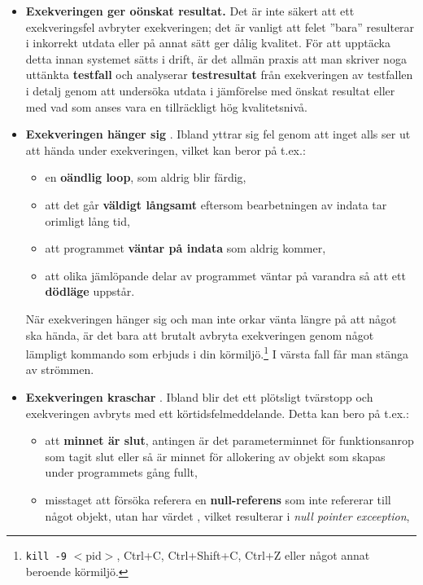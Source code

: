 \begin{itemize}
\begin{itemize}

\item \textbf{Exekveringen ger oönskat resultat.} Det är inte säkert att ett exekveringsfel avbryter exekveringen; det är vanligt att felet ''bara'' resulterar i inkorrekt utdata eller på annat sätt ger dålig kvalitet. För att upptäcka detta innan systemet sätts i drift, är det allmän praxis att man skriver noga uttänkta \textbf{testfall} och analyserar \textbf{testresultat} från exekveringen av  testfallen i detalj genom att undersöka utdata i jämförelse med önskat resultat eller med vad som anses vara en tillräckligt hög kvalitetsnivå.

\item \textbf{Exekveringen hänger sig} . Ibland yttrar sig fel genom att inget alls ser ut att hända under exekveringen, vilket kan beror på t.ex.:  
\begin{itemize}[nolistsep]
\item en \textbf{oändlig loop}, som aldrig blir färdig, 
\item att det går \textbf{väldigt långsamt} eftersom bearbetningen av indata tar orimligt lång tid,
\item att programmet \textbf{väntar på indata} som aldrig kommer,
\item att olika jämlöpande delar av programmet väntar på varandra så att ett \textbf{dödläge}  uppstår. 
\end{itemize}

När exekveringen hänger sig och man inte orkar vänta längre på att något ska hända, är det bara att brutalt avbryta exekveringen genom något lämpligt kommando som erbjuds i din körmiljö.\footnote{\texttt{kill -9} $<$pid$>$, Ctrl+C, Ctrl+Shift+C, Ctrl+Z eller något annat beroende körmiljö.} I värsta fall får man stänga av strömmen.

\item \textbf{Exekveringen kraschar} . Ibland blir det ett plötsligt tvärstopp och exekveringen avbryts med ett körtidsfelmeddelande. Detta kan bero på t.ex.:
\begin{itemize}[nolistsep]
\item att \textbf{minnet är slut}, antingen är det parameterminnet för funktionsanrop  som tagit slut eller så är minnet för allokering av objekt som skapas under programmets gång  fullt,
 
\item misstaget att försöka referera en \textbf{null-referens} som inte refererar till något objekt, utan har värdet , vilket resulterar i  \textit{null pointer exceeption},


\end{itemize}
\end{itemize}
\end{itemize}
